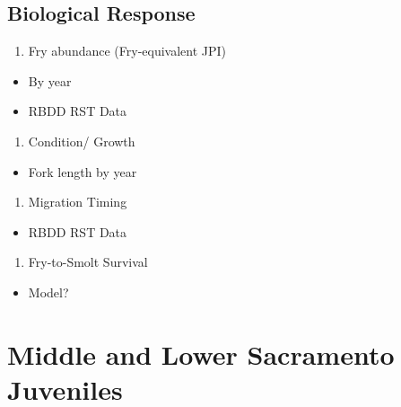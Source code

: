 \documentclass[
]{book}
\providecommand{\tightlist}{%
  \setlength{\itemsep}{0pt}\setlength{\parskip}{0pt}}
\theoremstyle{definition}
\theoremstyle{definition}
\theoremstyle{definition}
\theoremstyle{definition}
\theoremstyle{remark}
\begin{document}
\hypertarget{biological-response-2}{%
\section{Biological Response}\label{biological-response-2}}

\begin{enumerate}
\def\labelenumi{\arabic{enumi}.}
\tightlist
\item
  Fry abundance (Fry-equivalent JPI)
\end{enumerate}

\begin{itemize}
\tightlist
\item
  By year
\item
  RBDD RST Data
\end{itemize}

\begin{enumerate}
\def\labelenumi{\arabic{enumi}.}
\setcounter{enumi}{1}
\tightlist
\item
  Condition/ Growth
\end{enumerate}

\begin{itemize}
\tightlist
\item
  Fork length by year
\end{itemize}

\begin{enumerate}
\def\labelenumi{\arabic{enumi}.}
\setcounter{enumi}{2}
\tightlist
\item
  Migration Timing
\end{enumerate}

\begin{itemize}
\tightlist
\item
  RBDD RST Data
\end{itemize}

\begin{enumerate}
\def\labelenumi{\arabic{enumi}.}
\setcounter{enumi}{3}
\tightlist
\item
  Fry-to-Smolt Survival
\end{enumerate}

\begin{itemize}
\tightlist
\item
  Model?
\end{itemize}

\hypertarget{middle-and-lower-sacramento-juveniles}{%
\chapter{Middle and Lower Sacramento Juveniles}\label{middle-and-lower-sacramento-juveniles}}
\end{document}
